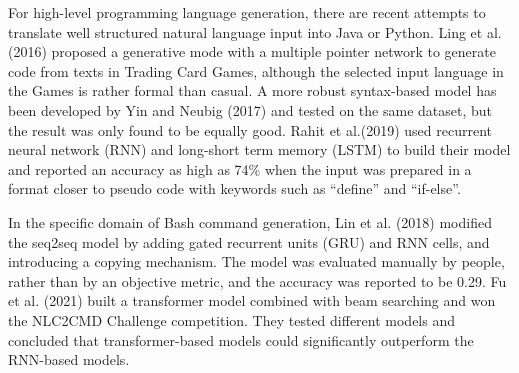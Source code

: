 For high-level programming language generation, there are recent attempts to
translate well structured natural language input into Java or Python.  Ling et
al. (2016) \cite{ling2016latent} proposed a generative mode with a multiple
pointer network to generate code from texts in Trading Card Games, although the selected input language in the Games is rather formal than casual. A more robust syntax-based model has been developed by Yin and Neubig (2017) \cite{yin2017syntactic} and tested on the same dataset, but the result was only found to be equally good. Rahit et al.(2019) \cite{rahit2019machine} used recurrent neural network (RNN) and long-short term memory (LSTM) to build their model and reported an accuracy as high as 74\% when the input was prepared in a format closer to pseudo code with keywords such as “define” and “if-else”.

In the specific domain of Bash command generation, Lin et al. (2018)
\cite{lin2018nl2bash} modified the seq2seq model by adding gated recurrent
units (GRU) and RNN cells, and introducing a copying mechanism. The model was
evaluated manually by people, rather than by an objective metric, and the accuracy was reported to be 0.29. Fu et al. (2021) \cite{Fu2021ATransform} built a transformer model combined with beam searching and won the NLC2CMD Challenge competition. They tested different models and concluded that transformer-based models could significantly outperform the RNN-based models.